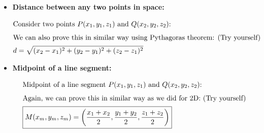 \begin{itemize}
\begin{itemize}
            \item \textbf{Distance between any two points in space:}
                \begin{center}
                \end{center}
                \begin{align*}
                    \intertext{Consider two points $P(x_1, y_1, z_1)$ and $Q(x_2, y_2, z_2)$:}
                    \intertext{We can also prove this in similar way using Pythagoras theorem: \hfill (Try yourself)}
                    d &= \sqrt{(x_2 - x_1)^2 + (y_2 - y_1)^2 + (z_2 - z_1)^2} \\
                \end{align*}
            \item \textbf{Midpoint of a line segment:}
                \begin{center}
                \end{center}
                \begin{align*}
                    \intertext{Midpoint of a line segment $P(x_1, y_1, z_1)$ and $Q(x_2, y_2, z_2)$:}
                    \intertext{Again, we can prove this in similar way as we did for 2D: \hfill (Try yourself)}
                    \Aboxed{M(x_m, y_m, z_m) &= \left(\frac{x_1 + x_2}{2}, \frac{y_1 + y_2}{2}, \frac{z_1 + z_2}{2}\right)}
                \end{align*}
        \end{itemize}
\end{itemize}
